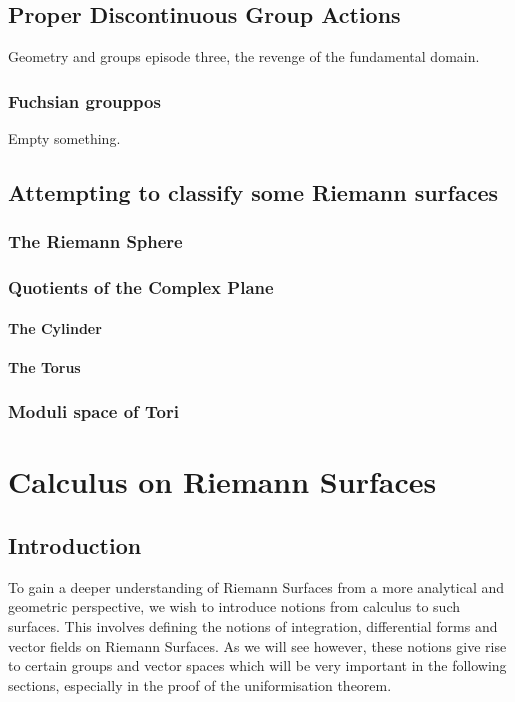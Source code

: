 \documentclass[11pt]{report}
\theoremstyle{definition}
\begin{document}
\section{Proper Discontinuous Group Actions}\label{PropDiscGrpAct}
Geometry and groups episode three, the revenge of the fundamental domain.
\subsection{Fuchsian grouppos}
Empty something.

\section{Attempting to classify some Riemann surfaces}
\subsection{The Riemann Sphere}
\subsection{Quotients of the Complex Plane}
\subsubsection{The Cylinder}
\subsubsection{The Torus}
\subsection{Moduli space of Tori}

\chapter{Calculus on Riemann Surfaces}
\section{Introduction}
To gain a deeper understanding of Riemann Surfaces from a more analytical
and geometric perspective, we wish to introduce notions from calculus to
such surfaces. This involves defining the notions of integration,
differential forms and vector fields on Riemann Surfaces. As we will see
however, these notions give rise to certain groups and vector spaces
which will be very important in the following sections, especially in the
proof of the uniformisation theorem.
\end{document}
